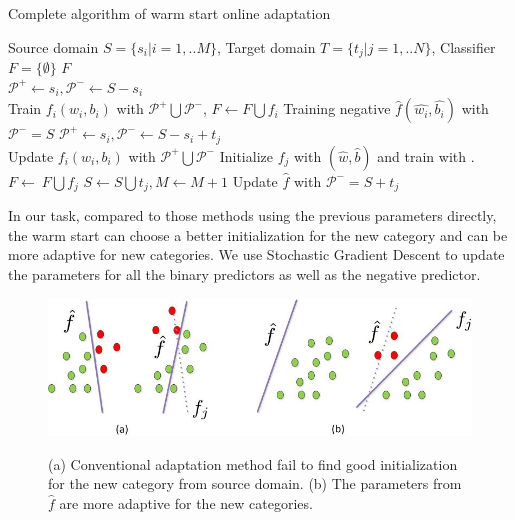 \begin{algorithm}
  \caption{Complete algorithm of warm start online adaptation}\label{algo:ws}
  \begin{algorithmic}[1]
    \REQUIRE Source domain $S = \{ {s_i}|i = 1,..M\} $, Target domain $T = \{ {t_j}|j = 1,..N\} $, Classifier $F = \{\emptyset\}$
    \ENSURE $F$\\
         \STATE $\mathcal{P^+}\leftarrow s_i, \mathcal{P^-}\leftarrow S-s_i$\\
          Train ${{f_i}\left( {{w_i},{b_i}} \right)}$ with $\mathcal{P^+}\bigcup\mathcal{P^-}$, $F\leftarrow F\bigcup f_i$
    \ENDFOR
    \STATE Training negative $\hat{f}\left( {\hat{w_i},\hat{b_i}} \right)$ with $\mathcal{P^-}=S$
             \STATE $\mathcal{P^+}\leftarrow s_i, \mathcal{P^-}\leftarrow S-s_i+t_j$ \\
              Update ${{f_i}\left( {{w_i},{b_i}} \right)}$ with $\mathcal{P^+}\bigcup\mathcal{P^-}$
        \ENDFOR
        \STATE Initialize $f_j$ with $(\hat{w},\hat{b})$ and train with .
        \STATE $F\leftarrow\ F\bigcup f_j$
        \STATE $S\leftarrow S\bigcup t_j, M\leftarrow M+1$
        \STATE Update $\hat{f}$ with $\mathcal{P^-}=S+t_j$
     \ENDWHILE
  \end{algorithmic}
\end{algorithm}

In our task, compared to those methods using the previous parameters directly, the warm start can choose a better initialization for the new category and can be more adaptive for new categories. We use Stochastic Gradient Descent to update the parameters for all the binary predictors as well as the negative predictor.

\begin{figure}
  \centering
  \includegraphics[scale = .6]{fig/domain.jpg}\\
  \caption{(a) Conventional adaptation method fail to find good initialization for the new category from source domain. (b) The parameters from $\hat{f}$ are more adaptive for the new categories.}
  \label{fig:wm}
\end{figure}
